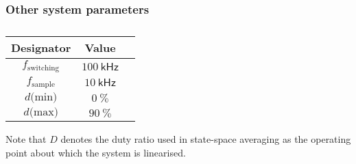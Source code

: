 \subsubsection{Other system parameters} \label{sec:system_params}
\begin{table}[H]
\centering
\begin{tabular}{|c|c|c|}
\hline
Designator & Value\\
\hline
$f_\text{switching}$ & $100 \ \mathsf{kHz}$\\
\hline
$f_\text{sample}$ & $10 \ \mathsf{kHz}$\\
\hline
$d \text{(min)}$ & $0 \ \mathsf{\%}$\\
\hline
$d \text{(max)}$ & $90 \ \mathsf{\%}$\\
\hline
\end{tabular}
\caption{}
\label{tab:system_values}
\end{table}
Note that $D$ denotes the duty ratio used in state-space averaging as the operating point about which the system is linearised.
